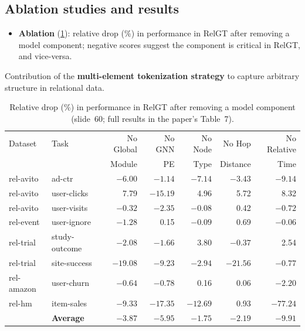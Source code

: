 \subsection{Ablation studies and results}\label{sec:lec13-relgt-res}

\begin{itemize}
  \item \textbf{Ablation} (\cref{tab:lec13-ablation}): relative drop (\%) in performance
    in RelGT after removing a model component; negative scores suggest the component is
    critical in RelGT, and vice-versa.
\end{itemize}
\begin{keyidea}
  Contribution of the \textbf{multi-element tokenization strategy} to capture arbitrary
  structure in relational data.
\end{keyidea}

\begin{table}[htbp]
  \centering\small
  \caption{Relative drop (\%) in performance in RelGT after removing a model component
  (slide~60; full results in the paper's Table~7).}
  \label{tab:lec13-ablation}
  \begin{tabular}{@{}llrrrrr@{}}
    \toprule
    Dataset & Task & No Global & No GNN & No Node & No Hop & No Relative\\
     & & Module & PE & Type & Distance & Time\\
    \midrule
    rel-avito & ad-ctr & $-6.00$ & $-1.14$ & $-7.14$ & $-3.43$ & $-9.14$\\
    rel-avito & user-clicks & 7.79 & $-15.19$ & 4.96 & 5.72 & 8.32\\
    rel-avito & user-visits & $-0.32$ & $-2.35$ & $-0.08$ & 0.42 & $-0.72$\\
    rel-event & user-ignore & $-1.28$ & 0.15 & $-0.09$ & 0.69 & $-0.06$\\
    rel-trial & study-outcome & $-2.08$ & $-1.66$ & 3.80 & $-0.37$ & 2.54\\
    rel-trial & site-success & $-19.08$ & $-9.23$ & $-2.94$ & $-21.56$ & $-0.77$\\
    rel-amazon & user-churn & $-0.64$ & $-0.78$ & 0.16 & 0.06 & $-2.20$\\
    rel-hm & item-sales & $-9.33$ & $-17.35$ & $-12.69$ & 0.93 & $-77.24$\\
    \midrule
     & \textbf{Average} & $-3.87$ & $-5.95$ & $-1.75$ & $-2.19$ & $-9.91$\\
    \bottomrule
  \end{tabular}
\end{table}

